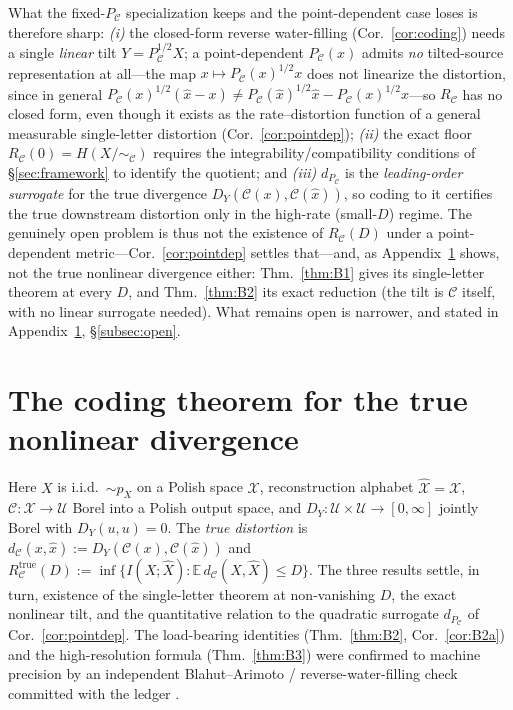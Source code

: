 \documentclass[lettersize,onecolumn]{IEEEtran}
\theoremstyle{definition}
\theoremstyle{remark}
\newcommand{\PC}{P_{\mathcal{C}}}
\newcommand{\E}{\mathbb{E}}
\begin{document}
\noindent What the fixed-$\PC$ specialization keeps and the point-dependent case
loses is therefore sharp: \emph{(i)} the closed-form reverse water-filling
(Cor.~\ref{cor:coding}) needs a single \emph{linear} tilt $Y=\PC^{1/2}X$; a
point-dependent $\PC(x)$ admits \emph{no} tilted-source representation at all---the map
$x\mapsto\PC(x)^{1/2}x$ does not linearize the distortion, since in general
$\PC(x)^{1/2}(\hat x-x)\neq\PC(\hat x)^{1/2}\hat x-\PC(x)^{1/2}x$---so
$R_{\mathcal{C}}$ has no closed form, even though it exists as the rate--distortion
function of a general measurable single-letter distortion (Cor.~\ref{cor:pointdep});
\emph{(ii)} the exact floor $R_{\mathcal{C}}(0)=H(X/\!\sim_{\mathcal{C}})$
requires the integrability/compatibility conditions of \S\ref{sec:framework} to
identify the quotient; and \emph{(iii)} $d_{\PC}$ is the \emph{leading-order surrogate}
for the true divergence $D_Y(\mathcal{C}(x),\mathcal{C}(\hat x))$, so coding to it
certifies the true downstream distortion only in the high-rate (small-$D$) regime. The
genuinely open problem is thus not the existence of $R_{\mathcal{C}}(D)$ under a
point-dependent metric---Cor.~\ref{cor:pointdep} settles that---and, as
Appendix~\ref{app:true} shows, not the true nonlinear divergence either:
Thm.~\ref{thm:B1} gives its single-letter theorem at every $D$, and Thm.~\ref{thm:B2}
its exact reduction (the tilt is $\mathcal{C}$ itself, with no linear surrogate needed).
What remains open is narrower, and stated in Appendix~\ref{app:true}, \S\ref{subsec:open}.

\section{The coding theorem for the true nonlinear divergence}
\label{app:true}

Here $X$ is i.i.d.\ $\sim p_X$ on a Polish space $\mathcal{X}$, reconstruction
alphabet $\hat{\mathcal{X}}=\mathcal{X}$, $\mathcal{C}:\mathcal{X}\to\mathcal{U}$ Borel
into a Polish output space, and $D_Y:\mathcal{U}\times\mathcal{U}\to[0,\infty]$ jointly
Borel with $D_Y(u,u)=0$. The \emph{true distortion} is
$d_{\mathcal{C}}(x,\hat x):=D_Y(\mathcal{C}(x),\mathcal{C}(\hat x))$ and
$R_{\mathcal{C}}^{\mathrm{true}}(D):=\inf\{I(X;\hat X):\E\,d_{\mathcal{C}}(X,\hat X)\le
D\}$. The three results settle, in turn, existence of the single-letter theorem at
non-vanishing $D$, the exact nonlinear tilt, and the quantitative relation to the
quadratic surrogate $d_{\PC}$ of Cor.~\ref{cor:pointdep}. The load-bearing identities
(Thm.~\ref{thm:B2}, Cor.~\ref{cor:B2a}) and the high-resolution formula
(Thm.~\ref{thm:B3}) were confirmed to machine precision by an independent
Blahut--Arimoto / reverse-water-filling check committed with the ledger
\cite{ledger2026}.
\end{document}
